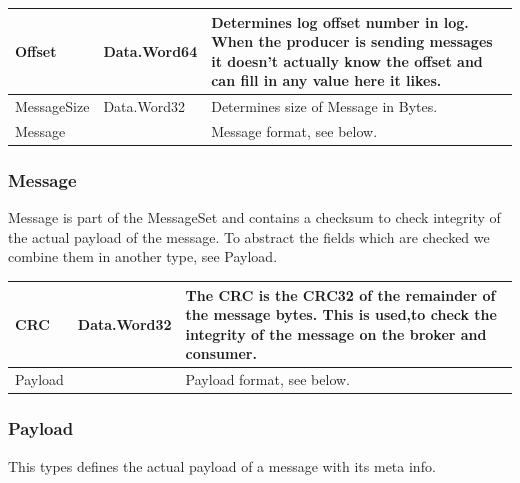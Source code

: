 \begin{table}[H]
\centering
\begin{tabular}{ l  l  p{11cm} }
\hline
Offset      & Data.Word64 & Determines log offset number in log.  When the producer is sending messages it doesn't actually know the offset and can fill in any value here it likes. \\ \hline
MessageSize & Data.Word32 & Determines size of Message in Bytes.               \\ \hline
Message     &     & Message format, see below.                                                                                                                    \\ \hline
\end{tabular}
\end{table}

\subsubsection{Message}
Message is part of the MessageSet and contains a checksum to check integrity of
the actual payload of the message. To abstract the fields which are checked we
combine them in another type, see Payload.


\begin{table}[H]
\centering
\begin{tabular}{ l  l  p{11cm} }
\hline
CRC     & Data.Word32 & The CRC is the CRC32 of the remainder of the message bytes. This is used,to check the integrity of the message on the broker and consumer. \\ \hline
Payload &      & Payload format, see below.                                                                                                                  \\ \hline
\end{tabular}
\end{table}

\subsubsection{Payload}
This types defines the actual payload of a message with its meta info.

